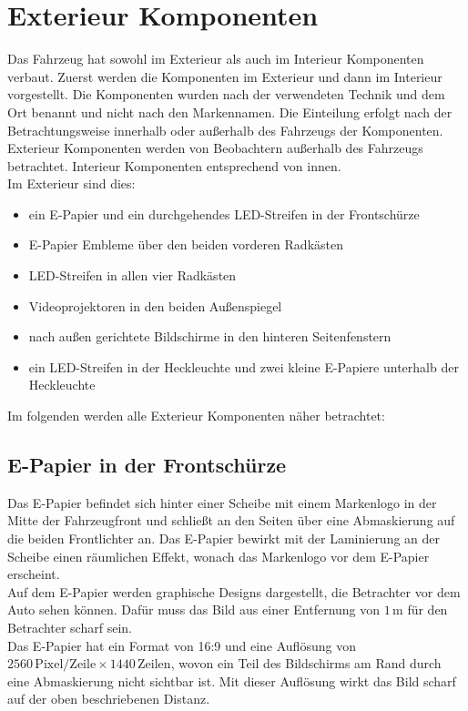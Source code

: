 \section{Exterieur Komponenten}
Das Fahrzeug hat sowohl im Exterieur als auch im Interieur Komponenten verbaut. Zuerst werden die Komponenten im Exterieur und dann im Interieur vorgestellt. Die Komponenten wurden nach der verwendeten Technik und dem Ort benannt und nicht nach den Markennamen. Die Einteilung erfolgt nach der Betrachtungsweise innerhalb oder außerhalb des Fahrzeugs der Komponenten. Exterieur Komponenten werden von Beobachtern außerhalb des Fahrzeugs betrachtet. Interieur Komponenten entsprechend von innen.\\
Im Exterieur sind dies:
\begin{itemize}
	\item ein E-Papier und ein durchgehendes LED-Streifen in der Frontschürze
	\item E-Papier Embleme über den beiden vorderen Radkästen
	\item LED-Streifen in allen vier Radkästen
	\item Videoprojektoren in den beiden Außenspiegel
	\item nach außen gerichtete Bildschirme in den hinteren Seitenfenstern
	\item ein LED-Streifen in der Heckleuchte und zwei kleine E-Papiere unterhalb der Heckleuchte
\end{itemize}
Im folgenden werden alle Exterieur Komponenten näher betrachtet:
\subsection{E-Papier in der Frontschürze}
Das E-Papier befindet sich hinter einer Scheibe mit einem Markenlogo in der Mitte der Fahrzeugfront und schließt an den Seiten über eine Abmaskierung auf die beiden Frontlichter an. Das E-Papier bewirkt mit der Laminierung an der Scheibe einen räumlichen Effekt, wonach das Markenlogo vor dem E-Papier erscheint. \\
Auf dem E-Papier werden graphische Designs dargestellt, die Betrachter vor dem Auto sehen können. Dafür muss das Bild aus einer Entfernung von $ 1\,\mathrm{m} $  für den Betrachter scharf sein. \\
Das E-Papier hat ein Format von 16:9 und eine Auflösung von  $ 2560\,\mathrm{Pixel}/\mathrm{Zeile} \times 1440\,\mathrm{Zeilen} $, wovon ein Teil des Bildschirms am Rand durch eine Abmaskierung nicht sichtbar ist. Mit dieser Auflösung wirkt das Bild scharf auf der oben beschriebenen Distanz.

